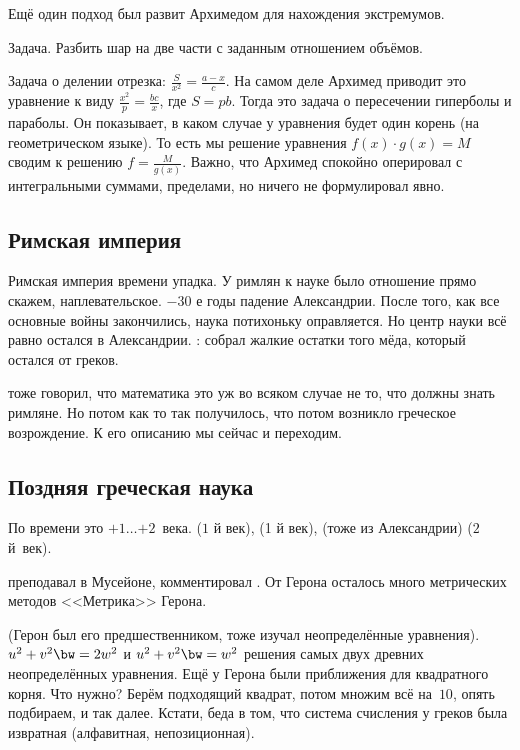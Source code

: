 \documentclass[a4paper,oneside,fleqn,10pt]{article}
\newcommand{\pe}[2]{${#1}\ldots{#2}$}
\begin{document}
Ещё один подход был развит Архимедом для нахождения экстремумов.

Задача. Разбить шар на две части с заданным отношением объёмов.

Задача о делении отрезка: $\frac{S}{x^2} = \frac{a-x}{c}$.  На самом
деле Архимед приводит это уравнение к виду $\frac{x^2}{p}
=\frac{bc}{x}$, где $S = pb$.  Тогда это задача о пересечении
гиперболы и параболы. Он показывает, в каком случае у уравнения будет
один корень (на геометрическом языке). То есть мы решение уравнения
$f(x) \cdot g (x) = M$ сводим к решению $f = \frac{M}{g(x)}$.  Важно,
что Архимед спокойно оперировал с интегральными суммами, пределами, но
ничего не формулировал явно.

\subsection{Римская империя}

Римская империя времени упадка. У римлян к науке было отношение прямо
скажем, наплевательское.  $-30$ е годы падение Александрии. После
того, как все основные войны закончились, наука потихоньку
оправляется. Но центр науки всё равно остался в Александрии.
:  собрал жалкие остатки того мёда, который
остался от греков.

 тоже говорил, что математика это уж во всяком случае
не то, что должны знать римляне.  Но потом как то так получилось, что
потом возникло греческое возрождение.  К его описанию мы сейчас и
переходим.

\subsection{Поздняя греческая наука}

По времени это \pe{+1}{+2}~века.   ($1$ й
век),  (1 й век),  (тоже из Александрии) ($2$ й~век).

 преподавал в Мусейоне, комментировал
.  От Герона осталось много метрических методов
<<Метрика>> Герона.

 (Герон был его предшественником, тоже
изучал неопределённые уравнения).  $u^2 + v^2 \bw= 2w^2$ и $u^2 + v^2
\bw= w^2$ решения самых двух древних неопределённых уравнения.  Ещё у
Герона были приближения для квадратного корня. Что нужно? Берём
подходящий квадрат, потом множим всё на~$10$, опять подбираем, и так
далее. Кстати, беда в том, что система счисления у греков была
извратная (алфавитная, непозиционная).
\end{document}

